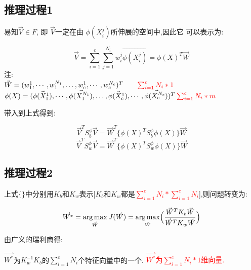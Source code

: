 \documentclass[12pt,a4paper,CJK]{beamer}
\DeclareMathOperator*{\argmax}{arg\,max}
\begin{document}
\begin{CJK*}{UTF8}{gkai}
\subsection{推理过程1}
\begin{frame}{\subsecname}
易知$\vec{V} \in F$, 即 $\vec{V}$一定在由 $\phi(X_i^j)$所伸展的空间中,因此它
可以表示为:
	\begin{displaybox}{123mm}
 		\[ 			
 			\vec{V} = \sum_{i=1}^{c} \sum_{j=1}^{N_i}
 			w_i^j\vec{\phi(X_i^j)} = \phi(X)^T\vec{W}
 		\]
注: 		\\
 		$
 			\vec{W} = (w_1^1,\cdots,w_1^{N_1},\ldots,w_c^1,\cdots,w_c^{N_c})^T  \qquad \textcolor{red}{\sum_{i=1}^{c}N_i*1}
 		$\\$
 			\phi(X)=(\vec{\phi(X_1^1)},\cdots,\vec{\phi(X_1^{N_1})},\ldots,\vec{\phi(X_c^1)},\cdots,\vec{\phi(X_c^{N_c})})^T  \: \textcolor{red}{\sum_{i=1}^{c}N_i*m}
 		$
	\end{displaybox}
带入到上式得到:
	\begin{displaybox}{90mm}
 		\[ 			
 			\vec{V}^T S_b^\phi \vec{V} = \vec{W}^T\lbrace \phi(X)^TS_b^\phi\phi(X)\rbrace \vec{W}
 		\]\[ 			
 			\vec{V}^T S_w^\phi \vec{V} = \vec{W}^T\lbrace \phi(X)^TS_w^\phi\phi(X)\rbrace \vec{W}
 		\]
	\end{displaybox}
	
\end{frame}


\subsection{推理过程2}
\begin{frame}{\subsecname}
上式$\lbrace \rbrace$中分别用$K_b$和$K_w$表示[$K_b$和$K_w$都是\textcolor{red}{$\sum_{i=1}^{c}N_i*\sum_{i=1}^{c}N_i$}],则问题转变为:
	\begin{displaybox}{90mm}
		\[ 			
 			\vec{W^*} = 
 			\argmax_{\vec{W}} J(\vec{W})=
 			\argmax_{\vec{W}} \Bigl(
 			\frac{\vec{W}^T K_b \vec{W}}{\vec{W}^T K_w \vec{W}}
 			\Bigr)
 		\]
 	\end{displaybox}
由广义的瑞利商得:
	\begin{displaybox}{90mm}
		$\vec{W^*}$为$K_w^{-1}K_b$的$\sum_{i=1}^{c}N_i$个特征向量中的一个.
		\textcolor{red}{$\vec{W^*}$为$\sum_{i=1}^{c}N_i*1$维向量.}	
 	\end{displaybox}
\end{frame}



\end{CJK*}
\end{document}
